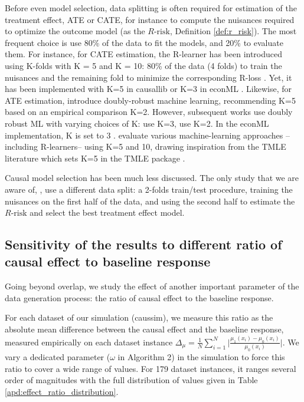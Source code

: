 \documentclass[a4paper,num-refs]{oup-contemporary}%
\begin{document}
Before even model selection, data splitting is often required for
estimation of the treatment effect, ATE or CATE, for instance to compute
the nuisances required to optimize the outcome model (as the
$R\text{-risk}$, Definition \ref{def:r_risk}).
%
The most frequent choice is use 80\% of the data to fit the models,
and 20\% to evaluate them.
%
For instance, for CATE estimation, the R-learner has been introduced using K-folds with K = 5
and K = 10: 80\% of the data (4 folds) to train the nuisances and the remaining
fold to minimize the corresponding R-loss \cite{nie_quasioracle_2017}.
Yet, it has been implemented with K=5 in causallib
\cite{causalevaluations} or K=3 in econML \cite{econml}.
Likewise, for ATE estimation, \cite{chernozhukov_double_2018}
introduce doubly-robust machine learning,
recommending K=5 based on an empirical comparison K=2. However,
subsequent works use doubly robust ML with varying choices
of K: \cite{loiseau_external_2022} use K=3, \cite{gao_assessment_2021} use
K=2. In the econML implementation, K is set to 3 \cite{econml}.
\cite{naimi2021challenges} evaluate various machine-learning approaches
--including R-learners-- using K=5 and 10, drawing inspiration from the
TMLE literature which sets
K=5 in the TMLE package \cite{tmle_package_2012}.

Causal model selection has been much less discussed. The only study that
we are aware of, \cite{schuler_comparison_2018}, use a different data
split: a 2-folds train/test procedure,
training the nuisances on the first half of the data, and using the
second half to estimate the $R\text{-risk}$ and select the best treatment
effect model.


\subsection{Sensitivity of the results to different ratio of causal effect to baseline response}\label{apd:effect_ratio}

Going beyond overlap, we study the effect of another important parameter of the
data generation process: the ratio of causal effect to the baseline response.

For each dataset of our simulation (caussim), we measure this ratio as the absolute mean
difference between the causal effect and the baseline response, measured
empirically on each dataset instance $\Delta_{\mu} = \frac{1}{N} \sum_{i=1}^N
    \big | \frac{\mu_{1}(x_i) - \mu_{0}(x_i)}{\mu_{0}(x_i)} \big|$. We vary a
dedicated parameter ($\omega$ in Algorithm 2) in the simulation to force this
ratio to cover a wide range of values. For 179 dataset instances, it ranges
several order of magnitudes with the full distribution of values given in
Table \ref{apd:effect_ratio_distribution}.
\end{document}
